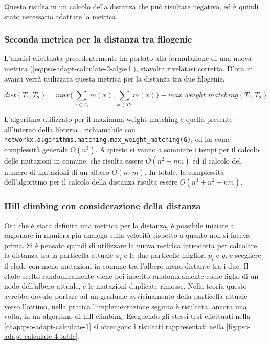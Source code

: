 Questo risulta in un calcolo della distanza che può risultare negativo, ed è quindi stato necessario adattare la metrica.

\subsubsection{Seconda metrica per la distanza tra filogenie}
\label{chap:pso-adapt-calculate-3}
L'analisi effettuata precedentemente ha portato alla formulazione di una nuova metrica (\autoref{eq:pso-adapt-calculate-2-algo-1}), stavolta rivelatasi corretta. D'ora in avanti verrà utilizzata questa metrica per la distanza tra due filogenie.

\begin{equation}
  \label{eq:pso-adapt-calculate-2-algo-1}
  dist(T_1, T_2) = max \{ \sum_{x \in T_1} m(x), \sum_{x \in T2} m(x) \} - max\_weight\_matching(T_1, T_2)
\end{equation}

L'algoritmo utilizzato per il maximum weight matching è quello presente all'interno della libreria , 
richiamabile con \texttt{networkx.algorithms.matching.max\_weight\_matching(G)}, ed ha come complessità generale $O(n^3)$. A questo si vanno a sommare i tempi per il calcolo delle mutazioni in comune, che risulta essere $O(n^2 + nm)$ ed il calcolo del numero di mutazioni di un albero $O(n \cdot m)$. In totale, la complessità dell'algoritmo per il calcolo della distanza risulta essere $O(n^3 + n^2 + nm)$.

\subsubsection{Hill climbing con considerazione della distanza}
\label{chap:pso-adapt-calculate-4}
Ora che è stata definita una metrica per la distanza, è possibile iniziare a ragionare in maniera più analoga sulla velocità rispetto a quanto non si faceva prima. Si è pensato quindi di utilizzare la nuova metrica introdotta per calcolare la distanza tra la particella attuale $x_i$ e le due particelle migliori $p_i$ e $g$, e scegliere il clade con meno mutazioni in comune tra l'albero meno distante tra i due. Il clade scelto randomicamente viene poi inserito randomicamente come figlio di un nodo dell'albero attuale, e le mutazioni duplicate rimosse. Nella teoria questo avrebbe dovuto portare ad un graduale avvicinamento della particella attuale verso l'ottimo, nella pratica l'implementazione seguita è risultata, ancora una volta, in un algoritmo di hill climbing.
Eseguendo gli stessi test effettuati nella \autoref{chap:pso-adapt-calculate-1} si ottengono i risultati rappresentati nella \autoref{fig:pso-adapt-calculate-4-table}. 

